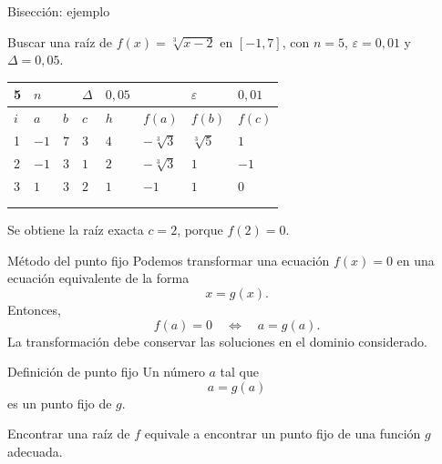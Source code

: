 \documentclass[original_version/main.tex]{subfiles}
\begin{document}
\begin{frame}[t]{Bisección: ejemplo}
\begin{minipage}[t][13mm][t]{\textwidth}\small Buscar una raíz de $f(x)=\sqrt[3]{x-2}$ en $[-1,7]$, con $n=5$, $\varepsilon=0{,}01$ y $\Delta=0{,}05$.\end{minipage}\par{\scriptsize\setlength{\tabcolsep}{2pt}\renewcommand{\arraystretch}{1}\begin{center}\begin{tabular}{|C{.04\textwidth}|C{.112\textwidth}|C{.112\textwidth}|C{.112\textwidth}|C{.112\textwidth}|C{.112\textwidth}|C{.112\textwidth}|C{.112\textwidth}|}
\hline
\rule{0pt}{4.3mm}5 & $n$ &  &  $\Delta$  & $0{,}05$ &  & $\varepsilon$ & $0{,}01$\\\hline
\rule{0pt}{4.3mm}$i$ & $a$ & $b$ & $c$ & $h$ & $f(a)$ & $f(b)$ & $f(c)$\\\hline
\rule{0pt}{4.3mm}1 & $-1$ & $7$ & $3$ & $4$ & $-\sqrt[3]3$ & $\sqrt[3]5$ & $1$\\\hline
\rule{0pt}{4.3mm}2 & $-1$ & $3$ & $1$ & $2$ & $-\sqrt[3]3$ & $1$ & $-1$\\\hline
\rule{0pt}{4.3mm}3 & $1$ & $3$ & $2$ & $1$ & $-1$ & $1$ & $0$\\\hline
\rule{0pt}{4.3mm} &  &  &  &  &  &  & \\\hline
\rule{0pt}{4.3mm} &  &  &  &  &  &  & \\\hline
\end{tabular}\end{center}}\begin{minipage}[t][10mm][t]{\textwidth}\footnotesize Se obtiene la raíz exacta $c=2$, porque $f(2)=0$.\end{minipage}
\end{frame}

\begin{frame}{Método del punto fijo}
Podemos transformar una ecuación $f(x)=0$ en una ecuación equivalente de la forma\[x=g(x).\]Entonces,\[f(a)=0\quad\Longleftrightarrow\quad a=g(a).\]La transformación debe conservar las soluciones en el dominio considerado.
\end{frame}

\begin{frame}{Definición de punto fijo}
Un número $a$ tal que\[a=g(a)\]es un \alert{punto fijo} de $g$.\par\medskip Encontrar una raíz de $f$ equivale a encontrar un punto fijo de una función $g$ adecuada.
\end{frame}
\end{document}
